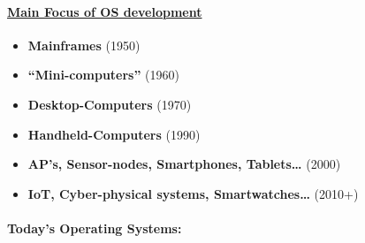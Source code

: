 \hypertarget{main-focus-of-os-development}{%
\paragraph{\texorpdfstring{\href{https://en.wikipedia.org/wiki/Timeline_of_operating_systems}{Main
Focus of OS
development}}{Main Focus of OS development}}\label{main-focus-of-os-development}}

\begin{itemize}
\tightlist
\item
  \textbf{Mainframes} (1950)
\item
  \textbf{``Mini-computers''} (1960)
\item
  \textbf{Desktop-Computers} (1970)
\item
  \textbf{Handheld-Computers} (1990)
\item
  \textbf{AP's, Sensor-nodes, Smartphones, Tablets\ldots{}} (2000)
\item
  \textbf{IoT, Cyber-physical systems, Smartwatches\ldots{}} (2010+)
\end{itemize}

\hypertarget{todays-operating-systems}{%
\paragraph{Today's Operating Systems:}\label{todays-operating-systems}}

